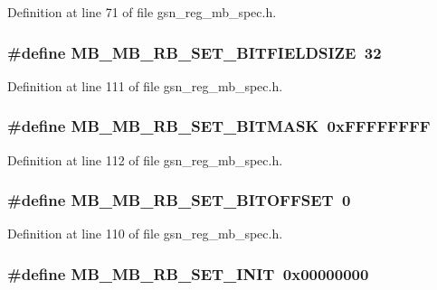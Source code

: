 Definition at line 71 of file gsn\_\-reg\_\-mb\_\-spec.h.

\hypertarget{a00562_acc4d213afc1a5925de80910f6f71b7d8}{
\subsubsection[{MB\_\-MB\_\-RB\_\-SET\_\-BITFIELDSIZE}]{\setlength{\rightskip}{0pt plus 5cm}\#define MB\_\-MB\_\-RB\_\-SET\_\-BITFIELDSIZE~32}}
\label{a00562_acc4d213afc1a5925de80910f6f71b7d8}


Definition at line 111 of file gsn\_\-reg\_\-mb\_\-spec.h.

\hypertarget{a00562_a82f43ee9f93fa1def7ded40605484c29}{
\subsubsection[{MB\_\-MB\_\-RB\_\-SET\_\-BITMASK}]{\setlength{\rightskip}{0pt plus 5cm}\#define MB\_\-MB\_\-RB\_\-SET\_\-BITMASK~0xFFFFFFFF}}
\label{a00562_a82f43ee9f93fa1def7ded40605484c29}


Definition at line 112 of file gsn\_\-reg\_\-mb\_\-spec.h.

\hypertarget{a00562_aecc5326021f2787ca6d14f839a6df050}{
\subsubsection[{MB\_\-MB\_\-RB\_\-SET\_\-BITOFFSET}]{\setlength{\rightskip}{0pt plus 5cm}\#define MB\_\-MB\_\-RB\_\-SET\_\-BITOFFSET~0}}
\label{a00562_aecc5326021f2787ca6d14f839a6df050}


Definition at line 110 of file gsn\_\-reg\_\-mb\_\-spec.h.

\hypertarget{a00562_af7596f9cf749d5d07220dd0d7d5734b7}{
\subsubsection[{MB\_\-MB\_\-RB\_\-SET\_\-INIT}]{\setlength{\rightskip}{0pt plus 5cm}\#define MB\_\-MB\_\-RB\_\-SET\_\-INIT~0x00000000}}
\label{a00562_af7596f9cf749d5d07220dd0d7d5734b7}


